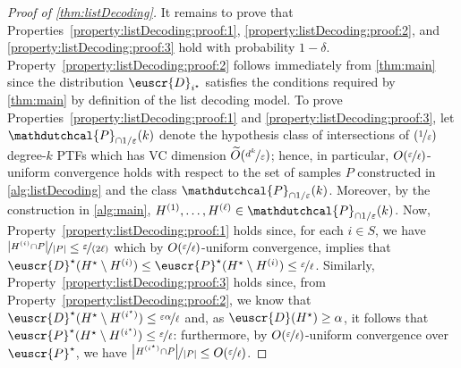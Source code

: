 \documentclass[11pt]{article}
\theoremstyle{plain}
\theoremstyle{definition}
\theoremstyle{remark}
\def\abs#1{\left| #1 \right|}
\newcommand{\sinparen}[1]{(#1)}
\newcommand{\nfrac}[2]{\nicefrac{#1}{#2}}
\newcommand{\eps}{\varepsilon}
\newcommand{\wt}[1]{\widetilde{#1}}
\newcommand{\customcal}[1]{\euscr{#1}}
\newcommand{\cD}{\customcal{D}}
\newcommand{\cP}{\customcal{P}}
\newcommand{\hypo}[1]{\mathdutchcal{#1}}
\newcommand{\hyP}{\hypo{P}}
\newcommand{\optset}{{H^\star}}
\newcommand{\cDtrue}{\cD^\star}
\newcommand{\cPtrue}{\cP^\star}
\begin{document}
\begin{proof}[Proof of \cref{thm:listDecoding}]
                It remains to prove that Properties~\ref{property:listDecoding:proof:1}, \ref{property:listDecoding:proof:2}, and \ref{property:listDecoding:proof:3} hold with probability $1-\delta$.
                Property~\ref{property:listDecoding:proof:2} follows immediately from \cref{thm:main} since the distribution $\cD_{i^\star}$ satisfies the conditions required by \cref{thm:main} by definition of the list decoding model.
                To prove Properties~\ref{property:listDecoding:proof:1} and \ref{property:listDecoding:proof:3}, let $\hyP_{\cap 1/\eps}(k)$ denote the hypothesis class of intersections of $(\nfrac{1}{\eps})$ degree-$k$ PTFs which has VC dimension $\wt{O}\sinparen{\nfrac{d^k}{\eps}}$; hence, in particular, $O(\nfrac{\eps}{\ell})$-uniform convergence holds with respect to the set of samples $P$ constructed in \cref{alg:listDecoding} and the class $\hyP_{\cap 1/\eps}(k)$.
                Moreover, by the construction in \cref{alg:main}, $H^{(1)},\dots,H^{(\ell)}\in \hyP_{\cap 1/\eps}(k)$. 
                Now, Property~\ref{property:listDecoding:proof:1} holds since, for each $i\in S$, we have $\nfrac{\abs{H^{(i)}\cap P}}{\abs{P}}\leq \nfrac{\eps}{(2\ell)}$ which by $O(\nfrac{\eps}{\ell})$-uniform convergence, implies that $\cDtrue(\optset \setminus H^{(i)})\leq \cPtrue(\optset \setminus H^{(i)})\leq \nfrac{\eps}{\ell}$.
                Similarly, Property~\ref{property:listDecoding:proof:3} holds since, from Property~\cref{property:listDecoding:proof:2}, we know that $\cDtrue(\optset\setminus H^{(i^\star)})\leq \nfrac{\eps\alpha}{\ell}$ and, as $\cD(\optset)\geq \alpha$, it follows that $\cPtrue(\optset\setminus H^{(i^\star)})\leq \nfrac{\eps}{\ell}$: furthermore, by $O(\nfrac{\eps}{\ell})$-uniform convergence over $\cPtrue$, we have $\nfrac{\abs{H^{(i^\star)} \cap P}}{\abs{P}}\leq O(\nfrac{\eps}{\ell})$.
                    


\end{proof}
\end{document}
